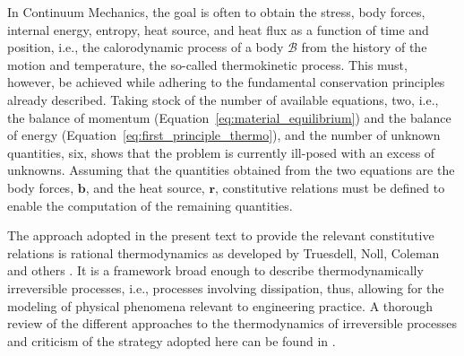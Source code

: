 In Continuum Mechanics, the goal is often to obtain the stress, body forces, internal energy, entropy, heat source, and heat flux as a function of time and position, i.e., the calorodynamic process of a body $\mathscr B$ from the history of the motion and temperature, the so-called thermokinetic process.
This must, however, be achieved while adhering to the fundamental conservation principles already described.
Taking stock of the number of available equations, two, i.e., the balance of momentum (Equation~\eqref{eq:material_equilibrium}) and the balance of energy (Equation~\eqref{eq:first_principle_thermo}), and the number of unknown quantities, six, shows that the problem is currently ill-posed with an excess of unknowns.
Assuming that the quantities obtained from the two equations are the body forces, $\mathbf b$, and the heat source, $\mathbf r$, constitutive relations must be defined to enable the computation of the remaining quantities.

The approach adopted in the present text to provide the relevant constitutive relations is rational thermodynamics as developed by Truesdell, Noll, Coleman and others \citep{nollMathematicalTheoryMechanical1958, colemanFoundationsLinearViscoelasticity1961, colemanExistenceCaloricEquations1964}.
It is a framework broad enough to describe thermodynamically irreversible processes, i.e., processes involving dissipation, thus, allowing for the modeling of physical phenomena relevant to engineering practice.
A thorough review of the different approaches to the thermodynamics of irreversible processes and criticism of the strategy adopted here can be found in \cite{lavenda1978thermodynamics}.

